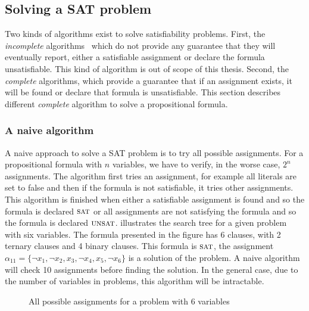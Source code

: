 \subsection{Solving a SAT problem}
Two kinds of algorithms exist to solve satisfiability problems.
First, the \emph{incomplete} algorithms~\cite{kautz2009incomplete} which do not provide any guarantee that they will eventually report,
either a satisfiable assignment or declare the formula unsatisfiable. This kind of algorithm is out of scope of this thesis. 
Second, the \emph{complete} algorithms, which provide a guarantee that if an assignment exists,
it will be found or declare that formula is unsatisfiable.
This section describes different \emph{complete} algorithm to solve a propositional formula.
\subsubsection{A naive algorithm}
A naive approach to solve a SAT problem is to try all possible assignments.
For a propositional formula with $n$ variables, we have to verify, in the worse case, $2^n$ assignments.  
The algorithm first tries an assignment, for example all literals are set to false and then if
the formula is not satisfiable, it tries other assignments. 
This algorithm is finished when either a satisfiable assignment is found and so
the formula is declared $\textsc{sat}$  or all assignments are not satisfying the formula and so the formula is declared $\textsc{unsat}$.
 illustrates the search tree for a given problem with six variables.
The  formula presented in the figure has 6 clauses, with 2 ternary clauses and 4 binary clauses.
This formula is $\textsc{sat}$, the assignment $\alpha_{11} = \{\neg x_1, \neg x_2, x_3, \neg x_4, x_5, \neg x_6 \}$ is a solution of the problem.
A naive algorithm will check 10 assignments before finding the solution. 
In the general case, due to the number of variables in problems, this algorithm will be intractable.
\begin{figure}[!htbp]
 \centering
 
 \caption{All possible assignments for a problem with 6 variables}
 \label{fig:naive_algo}
\end{figure}
